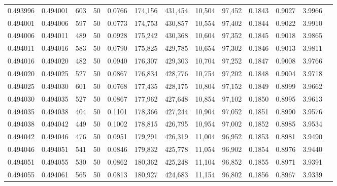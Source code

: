 \begin{tabular}{rrrrrrrrrrrrr}
0.493996 & 0.494001 &   603 &  50 &                                     0.0766 & 174,156 & 431,454 &  10,504 &  97,452 & 0.1843 & 0.9027 & 3.9966 \\
0.494001 & 0.494006 &   597 &  50 &                                     0.0773 & 174,753 & 430,857 &  10,554 &  97,402 & 0.1844 & 0.9022 & 3.9910 \\
0.494006 & 0.494011 &   489 &  50 &                                     0.0928 & 175,242 & 430,368 &  10,604 &  97,352 & 0.1845 & 0.9018 & 3.9865 \\
0.494011 & 0.494016 &   583 &  50 &                                     0.0790 & 175,825 & 429,785 &  10,654 &  97,302 & 0.1846 & 0.9013 & 3.9811 \\
0.494016 & 0.494020 &   482 &  50 &                                     0.0940 & 176,307 & 429,303 &  10,704 &  97,252 & 0.1847 & 0.9008 & 3.9766 \\
0.494020 & 0.494025 &   527 &  50 &                                     0.0867 & 176,834 & 428,776 &  10,754 &  97,202 & 0.1848 & 0.9004 & 3.9718 \\
0.494025 & 0.494030 &   601 &  50 &                                     0.0768 & 177,435 & 428,175 &  10,804 &  97,152 & 0.1849 & 0.8999 & 3.9662 \\
0.494030 & 0.494035 &   527 &  50 &                                     0.0867 & 177,962 & 427,648 &  10,854 &  97,102 & 0.1850 & 0.8995 & 3.9613 \\
0.494035 & 0.494038 &   404 &  50 &                                     0.1101 & 178,366 & 427,244 &  10,904 &  97,052 & 0.1851 & 0.8990 & 3.9576 \\
0.494038 & 0.494042 &   449 &  50 &                                     0.1002 & 178,815 & 426,795 &  10,954 &  97,002 & 0.1852 & 0.8985 & 3.9534 \\
0.494042 & 0.494046 &   476 &  50 &                                     0.0951 & 179,291 & 426,319 &  11,004 &  96,952 & 0.1853 & 0.8981 & 3.9490 \\
0.494046 & 0.494051 &   541 &  50 &                                     0.0846 & 179,832 & 425,778 &  11,054 &  96,902 & 0.1854 & 0.8976 & 3.9440 \\
0.494051 & 0.494055 &   530 &  50 &                                     0.0862 & 180,362 & 425,248 &  11,104 &  96,852 & 0.1855 & 0.8971 & 3.9391 \\
0.494055 & 0.494061 &   565 &  50 &                                     0.0813 & 180,927 & 424,683 &  11,154 &  96,802 & 0.1856 & 0.8967 & 3.9339 \\

\end{tabular}
